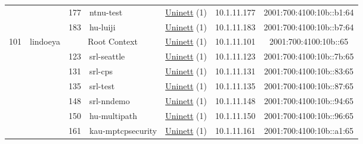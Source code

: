 \begin{small}
\begin{center}
\begin{longtable}{|c|c|c|c|c|c|c|c|}
  &  & \tiny{177} & \multicolumn{1}{|l|}{\tiny{ntnu-test}} & \multicolumn{2}{|c|}{\tiny{\href{https://www.uninett.no}{Uninett} (1)}} & \tiny{10.1.11.177} & \tiny{2001:700:4100:10b::b1:64} \\* \cline{3-3}\cline{4-4}\cline{5-5}\cline{6-6}\cline{7-7}\cline{8-8}
  &  & \tiny{183} & \multicolumn{1}{|l|}{\tiny{hu-luiji}} & \multicolumn{2}{|c|}{\tiny{\href{https://www.uninett.no}{Uninett} (1)}} & \tiny{10.1.11.183} & \tiny{2001:700:4100:10b::b7:64} \\ \hline
 \multirow{9}{*}{\tiny{101}} & \multicolumn{1}{|l|}{\multirow{9}{*}{\tiny{lindoeya}}} & \multicolumn{2}{|c|}{\tiny{Root Context}} & \multicolumn{2}{|c|}{\tiny{\href{https://www.uninett.no}{Uninett} (1)}} & \tiny{10.1.11.101} & \tiny{2001:700:4100:10b::65} \\* \cline{3-3}\cline{4-4}\cline{5-5}\cline{6-6}\cline{7-7}\cline{8-8}
  &  & \tiny{123} & \multicolumn{1}{|l|}{\tiny{srl-seattle}} & \multicolumn{2}{|c|}{\tiny{\href{https://www.uninett.no}{Uninett} (1)}} & \tiny{10.1.11.123} & \tiny{2001:700:4100:10b::7b:65} \\* \cline{3-3}\cline{4-4}\cline{5-5}\cline{6-6}\cline{7-7}\cline{8-8}
  &  & \tiny{131} & \multicolumn{1}{|l|}{\tiny{srl-cps}} & \multicolumn{2}{|c|}{\tiny{\href{https://www.uninett.no}{Uninett} (1)}} & \tiny{10.1.11.131} & \tiny{2001:700:4100:10b::83:65} \\* \cline{3-3}\cline{4-4}\cline{5-5}\cline{6-6}\cline{7-7}\cline{8-8}
  &  & \tiny{135} & \multicolumn{1}{|l|}{\tiny{srl-test}} & \multicolumn{2}{|c|}{\tiny{\href{https://www.uninett.no}{Uninett} (1)}} & \tiny{10.1.11.135} & \tiny{2001:700:4100:10b::87:65} \\* \cline{3-3}\cline{4-4}\cline{5-5}\cline{6-6}\cline{7-7}\cline{8-8}
  &  & \tiny{148} & \multicolumn{1}{|l|}{\tiny{srl-nndemo}} & \multicolumn{2}{|c|}{\tiny{\href{https://www.uninett.no}{Uninett} (1)}} & \tiny{10.1.11.148} & \tiny{2001:700:4100:10b::94:65} \\* \cline{3-3}\cline{4-4}\cline{5-5}\cline{6-6}\cline{7-7}\cline{8-8}
  &  & \tiny{150} & \multicolumn{1}{|l|}{\tiny{hu-multipath}} & \multicolumn{2}{|c|}{\tiny{\href{https://www.uninett.no}{Uninett} (1)}} & \tiny{10.1.11.150} & \tiny{2001:700:4100:10b::96:65} \\* \cline{3-3}\cline{4-4}\cline{5-5}\cline{6-6}\cline{7-7}\cline{8-8}
  &  & \tiny{161} & \multicolumn{1}{|l|}{\tiny{kau-mptcpsecurity}} & \multicolumn{2}{|c|}{\tiny{\href{https://www.uninett.no}{Uninett} (1)}} & \tiny{10.1.11.161} & \tiny{2001:700:4100:10b::a1:65} \\* \cline{3-3}\cline{4-4}\cline{5-5}\cline{6-6}\cline{7-7}\cline{8-8}

\end{longtable}
\end{center}
\end{small}
